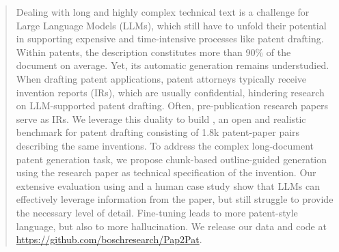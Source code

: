 \begin{abstract}
    Dealing with long and highly complex technical text is a challenge for Large Language Models (LLMs), which still have to unfold their potential in supporting expensive and time-intensive processes like patent drafting.
    Within patents, the description constitutes more than 90\% of the document on average.
    Yet, its automatic generation remains understudied.
    When drafting patent applications, patent attorneys typically receive invention reports (IRs), which are usually confidential, hindering research on LLM-supported patent drafting.
    Often, pre-publication research papers serve as IRs.
    We leverage this duality to build \DatasetName, an open and realistic benchmark for patent drafting consisting of 1.8k patent-paper pairs describing the same inventions.
    To address the complex long-document patent generation task, we propose chunk-based outline-guided generation using the research paper as technical specification of the invention.
    Our extensive evaluation using \DatasetName and a human case study show that LLMs can effectively leverage information from the paper, but still struggle to provide the necessary level of detail. 
    Fine-tuning leads to more patent-style language, but also to more hallucination. 
    We release our data and code at \url{https://github.com/boschresearch/Pap2Pat}.
\end{abstract}